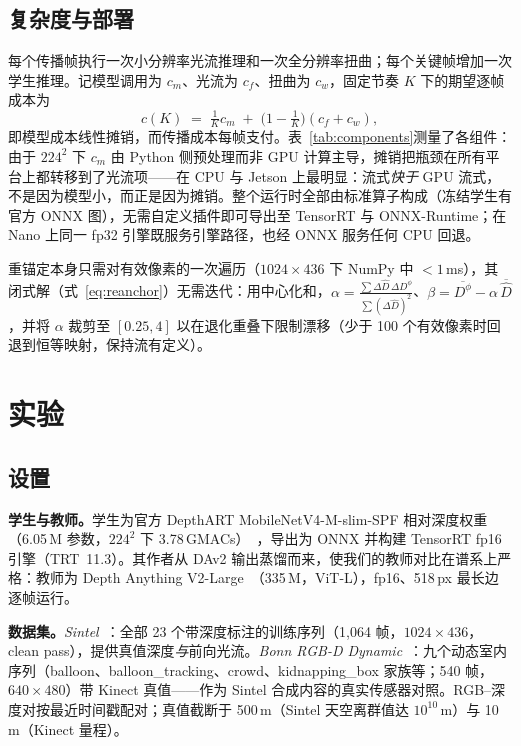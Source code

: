 \documentclass[10pt,twocolumn]{article}
\begin{document}
\subsection{复杂度与部署}
\label{sec:complexity}
每个传播帧执行一次小分辨率光流推理和一次全分辨率扭曲；每个关键帧增加一次学生推理。记模型调用为 $c_m$、光流为 $c_f$、扭曲为 $c_w$，固定节奏 $K$ 下的期望逐帧成本为
\begin{equation}
  c(K) \;=\; \tfrac{1}{K}c_m \;+\; \big(1 - \tfrac{1}{K}\big)(c_f + c_w),
  \label{eq:cost}
\end{equation}
即模型成本线性摊销，而传播成本每帧支付。表~\ref{tab:components}测量了各组件：由于 $224^2$ 下 $c_m$ 由 Python 侧预处理而非 GPU 计算主导，摊销把瓶颈在所有平台上都转移到了光流项——在 CPU 与 Jetson 上最明显：流式\emph{快于} GPU 流式，不是因为模型小，而正是因为摊销。整个运行时全部由标准算子构成（冻结学生有官方 ONNX 图），无需自定义插件即可导出至 TensorRT 与 ONNX-Runtime；在 Nano 上同一 fp32 引擎既服务引擎路径，也经 ONNX 服务任何 CPU 回退。

重锚定本身只需对有效像素的一次遍历（$1024{\times}436$ 下 NumPy 中 $<1$\,ms），其闭式解（式~\ref{eq:reanchor}）无需迭代：用中心化和，$\alpha = \tfrac{\sum \Delta\hat{D}\,\Delta D^{\phi}}{\sum (\Delta\hat{D})^2}$、$\beta = \overline{D^{\phi}} - \alpha\,\overline{\hat{D}}$，并将 $\alpha$ 裁剪至 $[0.25, 4]$ 以在退化重叠下限制漂移（少于 100 个有效像素时回退到恒等映射，保持流有定义）。

\section{实验}
\label{sec:exp}

\subsection{设置}
\textbf{学生与教师。}学生为官方 DepthART MobileNetV4-M-slim-SPF 相对深度权重（6.05\,M 参数，$224^2$ 下 3.78\,GMACs）~\cite{depthart}，导出为 ONNX 并构建 TensorRT fp16 引擎（TRT~11.3）。其作者从 DAv2 输出蒸馏而来，使我们的教师对比在谱系上严格：教师为 Depth Anything V2-Large~\cite{dav2}（335\,M，ViT-L），fp16、518\,px 最长边逐帧运行。

\textbf{数据集。}\emph{Sintel}~\cite{sintel}：全部 23 个带深度标注的训练序列（1{,}064 帧，$1024{\times}436$，clean pass），提供真值深度\emph{与}前向光流。\emph{Bonn RGB-D Dynamic}~\cite{bonn}：九个动态室内序列（balloon、balloon\_tracking、crowd、kidnapping\_box 家族等；540 帧，$640{\times}480$）带 Kinect 真值——作为 Sintel 合成内容的真实传感器对照。RGB--深度对按最近时间戳配对；真值截断于 500\,m（Sintel 天空离群值达 $10^{10}$\,m）与 10\,m（Kinect 量程）。
\end{document}
